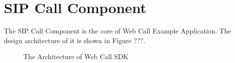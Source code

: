 
\chapter{SIP Call Component}
\label{sec:SIPCallComponent}

The SIP Call Component is the core of Web Call Example Application. The design architecture of it is shown in Figure ???.


\begin{figure}[!hbtp]
\centering
{}
\caption{The Architecture of Web Call SDK}
\label{fig:ArchitectureOfWebCallSDK}
\end{figure}


